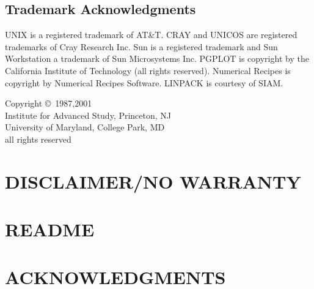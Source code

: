 \documentclass[headsepline,normalheadings]{book}
\begin{document}
\section*{Trademark Acknowledgments}
UNIX is a registered trademark of AT\&T.
CRAY and UNICOS are registered trademarks of Cray Research Inc.
Sun is a registered trademark and Sun Workstation a trademark of Sun
Microsystems Inc.
PGPLOT is copyright by the California Institute of Technology (all
rights reserved).
Numerical Recipes is copyright by Numerical Recipes Software.
LINPACK is courtesy of SIAM.


\begin{center}
\vspace{2 in}
Copyright \copyright\ 1987,2001\\
Institute for Advanced Study, Princeton, NJ\\
University of Maryland, College Park, MD\\
all rights reserved
\end{center}
\normalsize
\vspace*{\fill}
\cleardoublepage
\pagestyle{headings}
\tableofcontents
\newpage
{}
\listoftables
\newpage
{}
\listoffigures
\newpage

\chapter*{DISCLAIMER/NO WARRANTY}


\chapter*{README}


\chapter*{ACKNOWLEDGMENTS}

\end{document}
